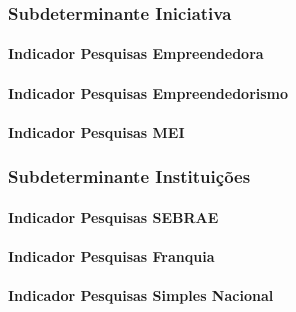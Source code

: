 \documentclass[
  12,
  dvipsnames]{article}
\begin{document}
\hypertarget{subdeterminante-iniciativa}{%
\subsubsection{Subdeterminante
Iniciativa}\label{subdeterminante-iniciativa}}

\hypertarget{indicador-pesquisas-empreendedora}{%
\paragraph{Indicador Pesquisas
Empreendedora}\label{indicador-pesquisas-empreendedora}}

\hypertarget{indicador-pesquisas-empreendedorismo}{%
\paragraph{Indicador Pesquisas
Empreendedorismo}\label{indicador-pesquisas-empreendedorismo}}

\hypertarget{indicador-pesquisas-mei}{%
\paragraph{Indicador Pesquisas MEI}\label{indicador-pesquisas-mei}}

\hypertarget{subdeterminante-instituiuxe7uxf5es}{%
\subsubsection{Subdeterminante
Instituições}\label{subdeterminante-instituiuxe7uxf5es}}

\hypertarget{indicador-pesquisas-sebrae}{%
\paragraph{Indicador Pesquisas
SEBRAE}\label{indicador-pesquisas-sebrae}}

\hypertarget{indicador-pesquisas-franquia}{%
\paragraph{Indicador Pesquisas
Franquia}\label{indicador-pesquisas-franquia}}

\hypertarget{indicador-pesquisas-simples-nacional}{%
\paragraph{Indicador Pesquisas Simples
Nacional}\label{indicador-pesquisas-simples-nacional}}
\end{document}
